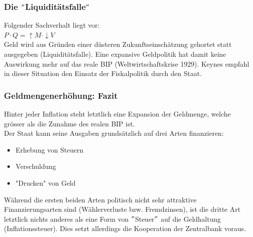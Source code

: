 \subsubsection{Die $"$Liquiditätsfalle$"$}
Folgender Sachverhalt liegt vor:\\
$P \cdot Q = \uparrow M \cdot \downarrow V$\\
Geld wird aus Gründen einer düsteren Zukunftseinschätzung gehortet statt ausgegeben (Liquiditätsfalle). Eine expansive Geldpolitik hat damit keine Auswirkung mehr auf das reale BIP (Weltwirtschaftskrise 1929). Keynes empfahl in dieser Situation den Einsatz der Fiskalpolitik durch den Staat.
\clearpage

\subsubsection{Geldmengenerhöhung: Fazit}
Hinter jeder Inflation steht letztlich eine Expansion der Geldmenge, welche grösser als die Zunahme des realen BIP ist.\\
Der Staat kann seine Ausgaben grundsätzlich auf drei Arten finanzieren:
\begin{itemize}
	\item Erhebung von Steuern
	\item Verschuldung
	\item "Drucken" von Geld
\end{itemize}
Während die ersten beiden Arten politisch nicht sehr attraktive Finanzierungsarten sind (Wählerverluste bzw. Fremdzinsen), ist die dritte Art letztlich nichts anderes als eine Form von $"$Steuer$"$ auf die Geldhaltung (Inflationssteuer). Dies setzt allerdings die Kooperation der Zentralbank voraus.

